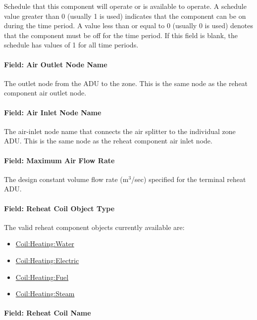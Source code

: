 Schedule that this component will operate or is available to operate. A schedule value greater than 0 (usually 1 is used) indicates that the component can be on during the time period. A value less than or equal to 0 (usually 0 is used) denotes that the component must be off for the time period. If this field is blank, the schedule has values of 1 for all time periods.

\paragraph{Field: Air Outlet Node Name}

The outlet node from the ADU to the zone. This is the same node as the reheat component air outlet node.

\paragraph{Field: Air Inlet Node Name}

The air-inlet node name that connects the air splitter to the individual zone ADU. This is the same node as the reheat component air inlet node.

\paragraph{Field: Maximum Air Flow Rate}

The design constant volume flow rate (m\(^{3}\)/sec) specified for the terminal reheat ADU.

\paragraph{Field: Reheat Coil Object Type}\label{field-reheat-coil-object-type}

The valid reheat component objects currently available are:

\begin{itemize}
\item
  \hyperref[coilheatingwater]{Coil:Heating:Water}
\item
  \hyperref[coilheatingelectric]{Coil:Heating:Electric}
\item
  \hyperref[coilheatinggas-000]{Coil:Heating:Fuel}
\item
  \hyperref[coilheatingsteam]{Coil:Heating:Steam}
\end{itemize}

\paragraph{Field: Reheat Coil Name}\label{field-reheat-coil-name}

